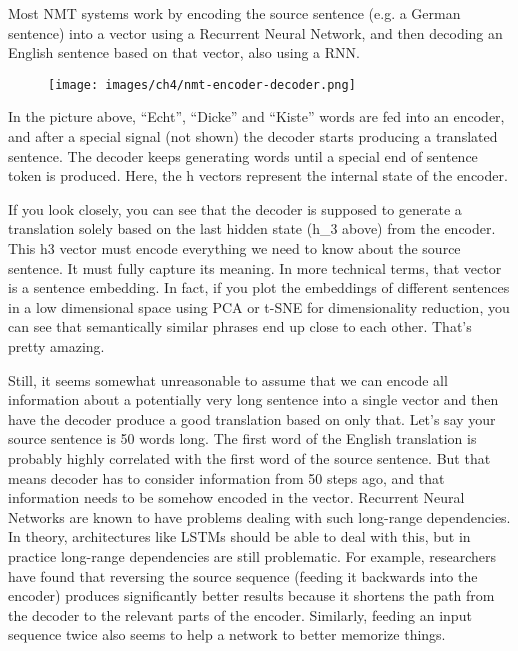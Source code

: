 Most NMT systems work by encoding the source sentence (e.g. a German sentence) into a vector using a Recurrent Neural Network, and then decoding an English sentence based on that vector, also using a RNN.

\begin{figure}[hpt]
	\centering
	\texttt{[image: images/ch4/nmt-encoder-decoder.png]}
	\caption{}
	\label{fig:nmt-encoder-decoder}
\end{figure}

In the picture above, “Echt”, “Dicke” and “Kiste” words are fed into an encoder, and after a special signal (not shown) the decoder starts producing a translated sentence. The decoder keeps generating words until a special end of sentence token is produced. Here, the h vectors represent the internal state of the encoder.

If you look closely, you can see that the decoder is supposed to generate a translation solely based on the last hidden state (h_3 above) from the encoder. This h3 vector must encode everything we need to know about the source sentence. It must fully capture its meaning. In more technical terms, that vector is a sentence embedding. In fact, if you plot the embeddings of different sentences in a low dimensional space using PCA or t-SNE for dimensionality reduction, you can see that semantically similar phrases end up close to each other. That’s pretty amazing.

Still, it seems somewhat unreasonable to assume that we can encode all information about a potentially very long sentence into a single vector and then have the decoder produce a good translation based on only that. Let’s say your source sentence is 50 words long. The first word of the English translation is probably highly correlated with the first word of the source sentence. But that means decoder has to consider information from 50 steps ago, and that information needs to be somehow encoded in the vector. Recurrent Neural Networks are known to have problems dealing with such long-range dependencies. In theory, architectures like LSTMs should be able to deal with this, but in practice long-range dependencies are still problematic. For example, researchers have found that reversing the source sequence (feeding it backwards into the encoder) produces significantly better results because it shortens the path from the decoder to the relevant parts of the encoder. Similarly, feeding an input sequence twice also seems to help a network to better memorize things.

